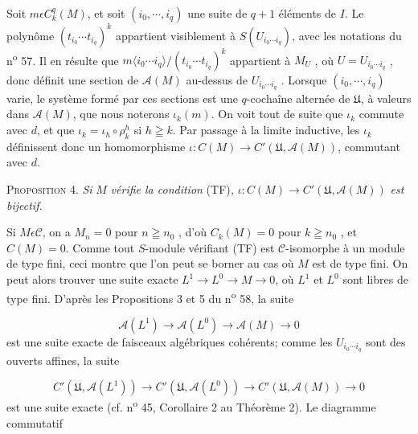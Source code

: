 Soit $m \epsilon C_k^q(M)$, et soit $(i_0 , \cdots , i_q)$ une suite de $q + 1$ éléments de $I$. Le polynôme $(t_{i_0} \cdots t_{i_q})^k$ appartient visiblement à $S(U_{i_0 \cdots i_q})$, avec les notations du n\textsuperscript{o} 57. Il en résulte que $m\langle i_0 \cdots i_q\rangle/(t_{i_0} \cdots t_{i_q})^k$ appartient à $M_U$ , où $U = U_{i_0 \cdots i_q}$ , donc définit une section de $\mathcal{A}(M)$ au-dessus de $U_{i_0 \cdots i_q}$ . Lorsque $(i_0 , \cdots , i_q)$ varie, le système formé par ces sections est une $q$-cochaîne alternée de $\mathfrak{U}$, à valeurs dans $\mathcal{A}(M)$, que nous noterons $\iota_k(m)$. On voit tout de suite que $\iota_k$ commute avec $d$, et que $\iota_k = \iota_h \circ \rho_k^h$ si $h \geqq k$. Par passage à la limite inductive, les $\iota_k$ définissent donc un homomorphisme $\iota : C(M) \to C'(\mathfrak{U}, \mathcal{A}(M))$, commutant avec $d$.

\textsc{Proposition} 4. \textit{Si} $M$ \textit{vérifie la condition} (TF)\textit{,} $\iota : C(M) \to C'(\mathfrak{U}, \mathcal{A}(M))$ \textit{est bijectif.}

Si $M \epsilon \mathcal{C}$, on a $M_n = 0$ pour $n \geqq n_0$ , d'où $C_k(M) = 0$ pour $k \geqq n_0$ , et $C(M) = 0$. Comme tout $S$-module vérifiant (TF) est $\mathcal{C}$-isomorphe à un module de type fini, ceci montre que l'on peut se borner au cas où $M$ est de type fini. On peut alors trouver une suite exacte $L^1 \to L^0 \to M \to 0$, où $L^1$ et $L^0$ sont libres de type fini. D'après les Propositions 3 et 5 du n\textsuperscript{o} 58, la suite

\begin{equation*}
\mathcal{A}(L^1) \to \mathcal{A}(L^0) \to \mathcal{A}(M) \to 0
\end{equation*}
est une suite exacte de faisceaux algébriques cohérents; comme les $U_{i_0 \cdots i_q}$ sont des ouverts affines, la suite

\begin{equation*}
C'(\mathfrak{U}, \mathcal{A}(L^1)) \to C'(\mathfrak{U}, \mathcal{A}(L^0)) \to C'(\mathfrak{U}, \mathcal{A}(M)) \to 0
\end{equation*}
est une suite exacte (cf. n\textsuperscript{o} 45, Corollaire 2 au Théorème 2). Le diagramme commutatif

